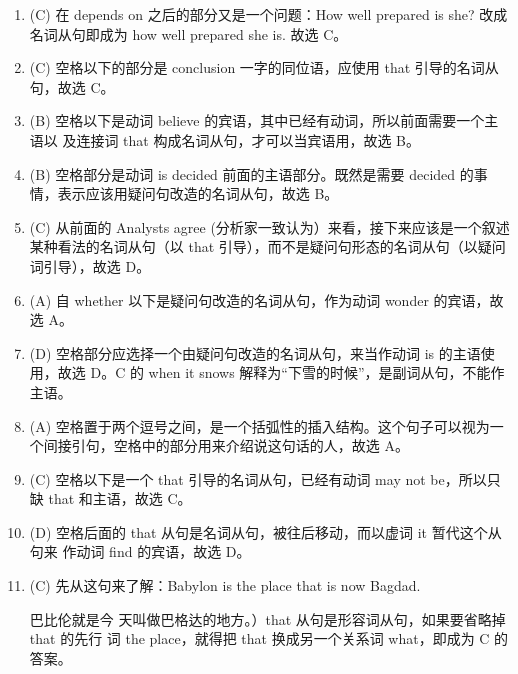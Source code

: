 \documentclass{yufa}
\begin{document}
\begin{enumerate}
\item  (C) 在 depends on 之后的部分又是一个问题：How well prepared is she? 改成名词从句即成为 how well prepared she is. 故选 C。


\item (C) 空格以下的部分是 conclusion 一字的同位语，应使用 that 引导的名词从句，故选 C。

\item (B) 空格以下是动词 believe 的宾语，其中已经有动词，所以前面需要一个主语以
  及连接词 that 构成名词从句，才可以当宾语用，故选 B。
\item (B) 空格部分是动词 is decided 前面的主语部分。既然是需要 decided 的事情，表示应该用疑问句改造的名词从句，故选 B。
\item (C) 从前面的 Analysts agree (分析家一致认为）来看，接下来应该是一个叙述某种看法的名词从句（以 that 引导），而不是疑问句形态的名词从句（以疑问词引导），故选 D。

\item  (A) 自 whether 以下是疑问句改造的名词从句，作为动词 wonder 的宾语，故选 A。

\item (D) 空格部分应选择一个由疑问句改造的名词从句，来当作动词 is 的主语使用，故选 D。C 的 when it snows 解释为“下雪的时候”，是副词从句，不能作主语。

\item (A) 空格置于两个逗号之间，是一个括弧性的插入结构。这个句子可以视为一个间接引句，空格中的部分用来介绍说这句话的人，故选 A。

\item (C) 空格以下是一个 that 引导的名词从句，已经有动词 may not be，所以只缺 that 和主语，故选 C。

\item (D) 空格后面的 that 从句是名词从句，被往后移动，而以虚词 it 暂代这个从句来
  作动词 find 的宾语，故选 D。

\item (C) 先从这句来了解：Babylon is the place that is now Bagdad.

巴比伦就是今
  天叫做巴格达的地方。）that 从句是形容词从句，如果要省略掉 that 的先行
  词 the place，就得把 that 换成另一个关系词 what，即成为 C 的答案。

\end{enumerate}



\backmatter
\end{document}
